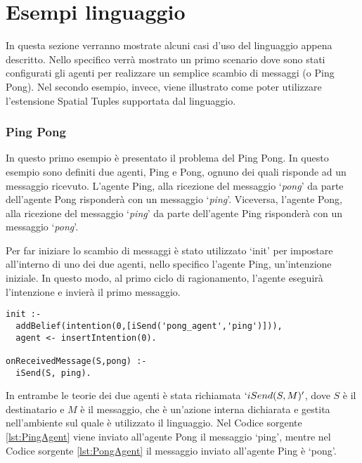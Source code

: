 \section{Esempi linguaggio}
In questa sezione verranno mostrate alcuni casi d'uso del linguaggio appena descritto. Nello specifico verrà mostrato un primo scenario dove sono stati configurati gli agenti per realizzare un semplice scambio di messaggi (o Ping Pong). Nel secondo esempio, invece, viene illustrato come poter utilizzare l'estensione Spatial Tuples supportata dal linguaggio.

\subsubsection{Ping Pong}
In questo primo esempio è presentato il problema del Ping Pong. In questo esempio sono definiti due agenti, Ping e Pong, ognuno dei quali risponde ad un messaggio ricevuto. L'agente Ping, alla ricezione del messaggio `\textit{pong}' da parte dell'agente Pong risponderà con un messaggio `\textit{ping}'. Viceversa, l'agente Pong, alla ricezione del messaggio `\textit{ping}' da parte dell'agente Ping risponderà con un messaggio `\textit{pong}'.

Per far iniziare lo scambio di messaggi è stato utilizzato `init' per impostare all'interno di uno dei due agenti, nello specifico l'agente Ping, un'intenzione iniziale. In questo modo, al primo ciclo di ragionamento, l'agente eseguirà l'intenzione e invierà il primo messaggio.
\lstset{
  basicstyle=\ttfamily,
  captionpos=b,
  frame=tb,
}
\medskip
\begin{lstlisting}[firstnumber=1,label={lst:PingAgent},caption={Agente Ping}]
init :-
  addBelief(intention(0,[iSend('pong_agent','ping')])),
  agent <- insertIntention(0).

onReceivedMessage(S,pong) :-
  iSend(S, ping).
\end{lstlisting}

In entrambe le teorie dei due agenti è stata richiamata $`iSend(S, M)'$, dove $S$ è il destinatario e $M$ è il messaggio, che è un'azione interna dichiarata e gestita nell'ambiente sul quale è utilizzato il linguaggio. Nel Codice sorgente \ref{lst:PingAgent} viene inviato all'agente Pong il messaggio `ping', mentre nel Codice sorgente \ref{lst:PongAgent} il messaggio inviato all'agente Ping è `pong'.


